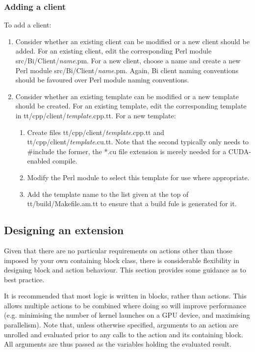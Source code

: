 \subsubsection{Adding a client\label{Adding_a_client}}

To add a client:
\begin{enumerate}
\item Consider whether an existing client can be modified or a new client
  should be added. For an existing client, edit the corresponding Perl module
  \textsf{src/Bi/Client/\textit{name}.pm}. For a new client, choose a name
  and create a new Perl module \textsf{src/Bi/Client/\textit{name}.pm}. Again,
  Bi client naming conventions should be favoured over Perl module naming
  conventions.
\item Consider whether an existing template can be modified or a new template
  should be created. For an existing template, edit the corresponding template
  in \textsf{tt/cpp/client/\textit{template}.cpp.tt}. For a new template:
\begin{enumerate}
\item Create files \textsf{tt/cpp/client/\textit{template}.cpp.tt} and
  \textsf{tt/cpp/client/\textit{template}.cu.tt}. Note that the second
  typically only needs to \textsf{\#include} the former, the \textsf{*.cu}
  file extension is merely needed for a CUDA-enabled compile.
\item Modify the Perl module to select this template for use where
  appropriate.
\item Add the template name to the list given at the top of
  \textsf{tt/build/Makefile.am.tt} to ensure that a build fule is generated
  for it.
\end{enumerate}
\end{enumerate}

\subsection{Designing an extension\label{Designing_an_extension}}

Given that there are no particular requirements on actions other than those
imposed by your own containing block class, there is considerable flexibility
in designing block and action behaviour. This section provides some guidance
as to best practice.

It is recommended that most logic is written in blocks, rather than
actions. This allows multiple actions to be combined where doing so will
improve performance (e.g. minimising the number of kernel launches on a GPU
device, and maximising parallelism). Note that, unless otherwise specified,
arguments to an action are unrolled and evaluated prior to any calls to the
action and its containing block. All arguments are thus passed as the
variables holding the evaluated result.

